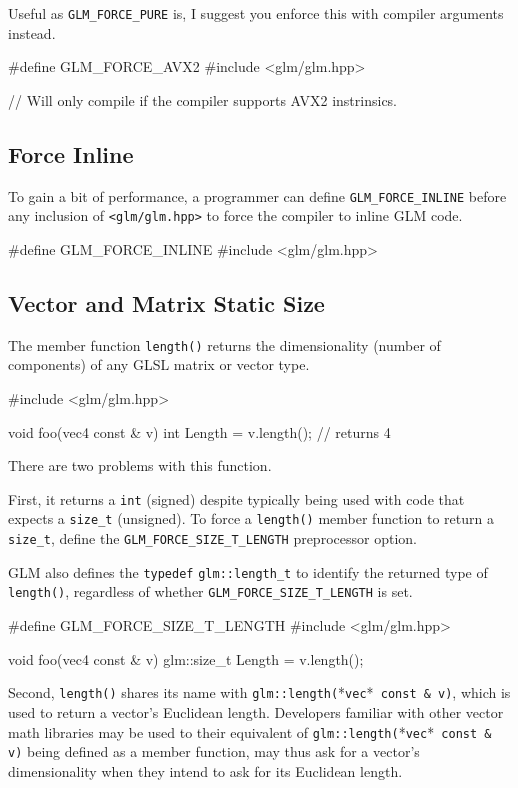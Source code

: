 \documentclass{scrartcl}
\numberwithin{figure}{subsection}
\begin{document}
Useful as \verb|GLM_FORCE_PURE| is, I suggest you enforce this with compiler arguments instead.

\begin{cppcode}
#define GLM_FORCE_AVX2
#include <glm/glm.hpp>

// Will only compile if the compiler supports AVX2 instrinsics.
\end{cppcode}

\subsection{Force Inline}
To gain a bit of performance, a programmer can define \verb|GLM_FORCE_INLINE| before any inclusion of \verb|<glm/glm.hpp>| to force the compiler to inline GLM code.

\begin{cppcode}
#define GLM_FORCE_INLINE 
#include <glm/glm.hpp>
\end{cppcode}

\subsection{Vector and Matrix Static Size}
The member function \verb|length()| returns the dimensionality (number of components) of any GLSL matrix or vector type.

\begin{cppcode}
#include <glm/glm.hpp>

void foo(vec4 const & v)
{
  int Length = v.length();  // returns 4
}
\end{cppcode}

There are two problems with this function.

First, it returns a \verb|int| (signed) despite typically being used with code that expects a \verb|size_t| (unsigned). To force a \verb|length()| member function to return a \verb|size_t|, define the \verb|GLM_FORCE_SIZE_T_LENGTH| preprocessor option.

GLM also defines the \verb|typedef| \verb|glm::length_t| to identify the returned type of \verb|length()|, regardless of whether \verb|GLM_FORCE_SIZE_T_LENGTH| is set.

\begin{cppcode}
#define GLM_FORCE_SIZE_T_LENGTH 
#include <glm/glm.hpp>

void foo(vec4 const & v)
{
  glm::size_t Length = v.length();
}
\end{cppcode}

Second, \verb|length()| shares its name with \verb|glm::length(|*\verb|vec|*\verb| const & v)|, which is used to return a vector's Euclidean length. Developers familiar with other vector math libraries may be used to their equivalent of \verb|glm::length(|*\verb|vec|*\verb| const & v)| being defined as a member function, may thus ask for a vector's dimensionality when they intend to ask for its Euclidean length.
\end{document}
